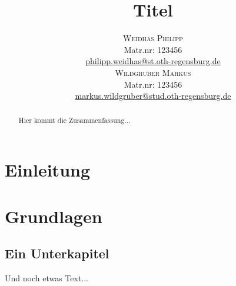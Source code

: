 \documentclass[twosided,a4,10pt]{article}
\title{\vspace{-5mm}%
	\fontsize{20pt}{10pt}\selectfont
	\textbf{Titel}
	}
\author{
	\large
       \begin{minipage}[t]{0.5\linewidth}
         \begin{center}
           	\textsc{Weidhas Philipp}\\[2mm]
                 \normalsize	Matr.nr: 123456\\
                 \normalsize
                 \href{mailto:philipp.weidhas@st.oth-regensburg.de}
                 {philipp.weidhas@st.oth-regensburg.de}      
         \end{center}
       \end{minipage}        
       \begin{minipage}[t]{0.5\linewidth}
         \begin{center}
           	\textsc{Wildgruber Markus}\\[2mm]
                 \normalsize	Matr.nr: 123456\\
                 \normalsize
                 \href{mailto:markus.wildgruber@stud.oth-regensburg.de}
                 {markus.wildgruber@stud.oth-regensburg.de}      
         \end{center}
       \end{minipage}
     }
\begin{document}
\maketitle
\thispagestyle{fancy}

\begin{abstract}
\noindent Hier kommt die Zusammenfassung...
\end{abstract}
	

\begin{multicols}{2}


\section{Einleitung}

\section{Grundlagen}

\subsection{Ein Unterkapitel}
Und noch etwas Text... \cite{muster}


\end{multicols}
\end{document}
